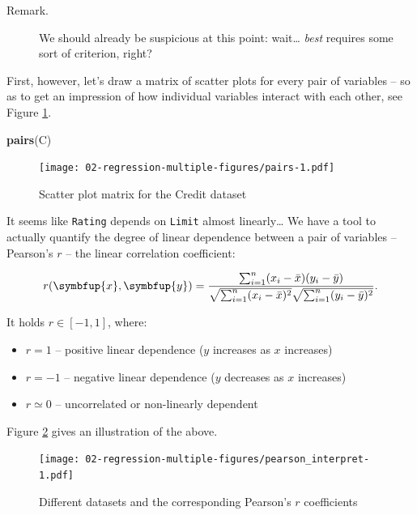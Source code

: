 \documentclass[10pt,b5paper,krantz1]{krantz}
\newenvironment{Shaded}{\begin{snugshade}}{\end{snugshade}}
\newcommand{\KeywordTok}[1]{\textcolor[rgb]{0.27,0.27,0.27}{\textbf{#1}}}
\newcommand{\NormalTok}[1]{#1}
\providecommand{\tightlist}{%
  \setlength{\itemsep}{0pt}\setlength{\parskip}{0pt}}
\renewcommand{\boldsymbol}[1]{\symbfup{#1}}
\begin{document}
\begin{description}
\item[Remark.]
We should already be suspicious at this point:
wait\ldots{} \emph{best} requires some sort of criterion, right?
\end{description}

First, however, let's draw a matrix of scatter plots for
every pair of variables
-- so as to get an impression of how individual variables
interact with each other, see Figure \ref{fig:pairs}.

\begin{Shaded}
\begin{Highlighting}[]
\KeywordTok{pairs}\NormalTok{(C)}
\end{Highlighting}
\end{Shaded}

\begin{figure}
\hypertarget{fig:pairs}{%
\centering
\texttt{[image: 02-regression-multiple-figures/pairs-1.pdf]}
\caption{Scatter plot matrix for the Credit dataset}\label{fig:pairs}
}
\end{figure}

It seems like \texttt{Rating} depends on \texttt{Limit} almost linearly\ldots{}
We have a tool to actually quantify the degree of linear dependence
between a pair of variables --
Pearson's \(r\) -- the linear correlation coefficient:

\[
r(\boldsymbol{x},\boldsymbol{y}) = \frac{
    \sum_{i=1}^n (x_i-\bar{x}) (y_i-\bar{y})
}{
    \sqrt{\sum_{i=1}^n (x_i-\bar{x})^2} \sqrt{\sum_{i=1}^n (y_i-\bar{y})^2}
}.
\]

It holds \(r\in[-1,1]\), where:

\begin{itemize}
\tightlist
\item
  \(r=1\) -- positive linear dependence (\(y\) increases as \(x\) increases)
\item
  \(r=-1\) -- negative linear dependence (\(y\) decreases as \(x\) increases)
\item
  \(r\simeq 0\) -- uncorrelated or non-linearly dependent
\end{itemize}

Figure \ref{fig:pearson_interpret} gives an illustration of the above.

\begin{figure}
\hypertarget{fig:pearson_interpret}{%
\centering
\texttt{[image: 02-regression-multiple-figures/pearson\_interpret-1.pdf]}
\caption{Different datasets and the corresponding Pearson's \(r\) coefficients}\label{fig:pearson_interpret}
}
\end{figure}
\end{document}
